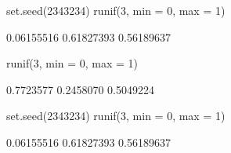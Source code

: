 \begin{Schunk}
\begin{Sinput}
  set.seed(2343234)
  runif(3, min = 0, max = 1)
\end{Sinput}
\begin{Soutput}
[1] 0.06155516 0.61827393 0.56189637
\end{Soutput}
\begin{Sinput}
  runif(3, min = 0, max = 1)
\end{Sinput}
\begin{Soutput}
[1] 0.7723577 0.2458070 0.5049224
\end{Soutput}
\begin{Sinput}
  set.seed(2343234)
  runif(3, min = 0, max = 1)
\end{Sinput}
\begin{Soutput}
[1] 0.06155516 0.61827393 0.56189637
\end{Soutput}
\end{Schunk}
